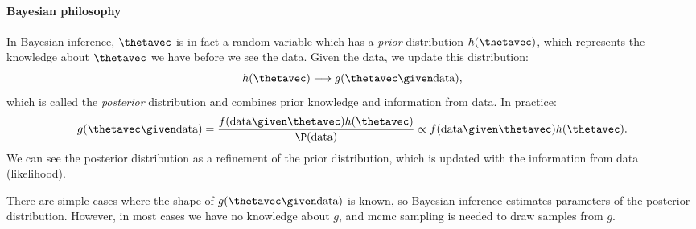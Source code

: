 \paragraph{Bayesian philosophy} In Bayesian inference, $\thetavec$ is in fact a random variable which has a \emph{prior} distribution $h(\thetavec)$, which represents the knowledge about $\thetavec$ we have before we see the data. Given the data, we update this distribution:
\begin{equation}
    h(\thetavec) \longrightarrow g(\thetavec \given \text{data}),
\end{equation}
which is called the \emph{posterior} distribution and combines prior knowledge and information from data. In practice:
\begin{equation}
    g(\thetavec \given \text{data}) = \frac{f(\text{data} \given \thetavec)h(\thetavec)}{\P(\text{data})} \propto f(\text{data} \given \thetavec)h(\thetavec).
\end{equation}
We can see the posterior distribution as a refinement of the prior distribution, which is updated with the information from data (likelihood).

There are simple cases where the shape of $g(\thetavec \given \text{data})$ is known, so Bayesian inference estimates parameters of the posterior distribution. However, in most cases we have no knowledge about $g$, and \ac{mcmc} sampling is needed to draw samples from $g$.

